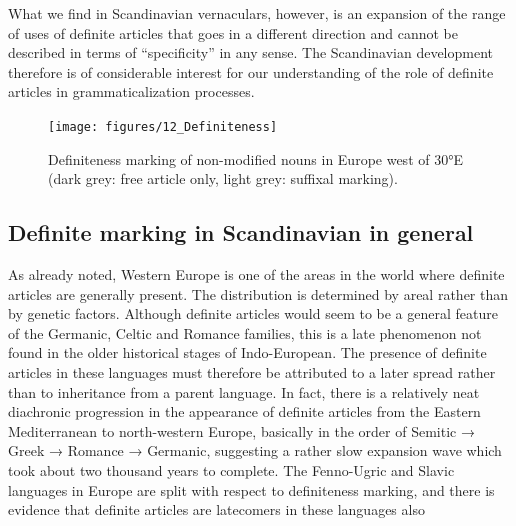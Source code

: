 \z

What we find in Scandinavian vernaculars, however, is an expansion of the range of uses of definite articles that goes in a different direction and cannot be described in terms of “specificity” in any sense. The Scandinavian development therefore is of considerable interest for our understanding of the role of definite articles in grammaticalization processes.

\begin{figure}[h]

\texttt{[image: figures/12\_Definiteness]}
\caption{Definiteness marking of non-modified nouns in Europe west of 30°E (dark grey: free article only, light grey: suffixal marking).}
\label{map:10}
\end{figure}



\subsection{Definite marking in Scandinavian in general}
\label{sec:3.1.4}

As already noted, Western Europe is one of the areas in the world where definite articles are generally present. The distribution is determined by areal rather than by genetic factors. Although definite articles would seem to be a general feature of the Germanic, Celtic and Romance families, this is a late phenomenon not found in the older historical stages of Indo-European. The presence of definite articles in these languages must therefore be attributed to a later spread rather than to inheritance from a parent language. In fact, there is a relatively neat diachronic progression in the appearance of definite articles from the Eastern Mediterranean to north-western Europe, basically in the order of Semitic → Greek → Romance → Germanic, suggesting a rather slow expansion wave which took about two thousand years to complete. The Fenno-Ugric and Slavic languages in Europe are split with respect to definiteness marking, and there is evidence that definite articles are latecomers in these languages also

